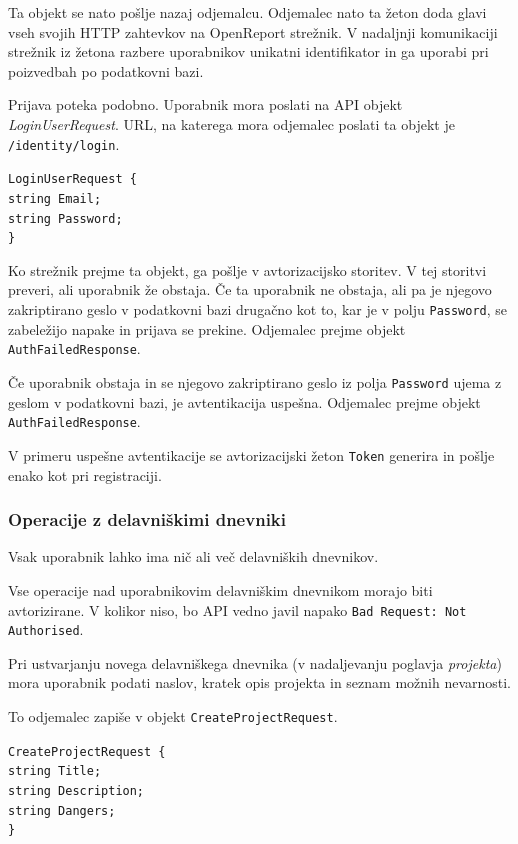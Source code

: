 \documentclass[a4paper, 12pt]{book}
\begin{document}
Ta objekt se nato pošlje nazaj odjemalcu.
Odjemalec nato ta žeton doda glavi vseh svojih HTTP zahtevkov na OpenReport strežnik.
V nadaljnji komunikaciji strežnik iz žetona razbere uporabnikov unikatni identifikator in ga uporabi pri poizvedbah po podatkovni bazi.

Prijava poteka podobno.
Uporabnik mora poslati na API objekt \textit{LoginUserRequest}.
URL, na katerega mora odjemalec poslati ta objekt je \texttt{/identity/login}.

\noindent
\texttt{LoginUserRequest \{ \\
  string Email; \\
  string Password; \\
\} }

Ko strežnik prejme ta objekt, ga pošlje v avtorizacijsko storitev.
V tej storitvi preveri, ali uporabnik že obstaja.
Če ta uporabnik ne obstaja, ali pa je njegovo zakriptirano geslo v podatkovni bazi drugačno kot to, kar je v polju \texttt{Password}, se zabeležijo napake in prijava se prekine.
Odjemalec prejme objekt \texttt{AuthFailedResponse}.

Če uporabnik obstaja in se njegovo zakriptirano geslo iz polja \texttt{Password} ujema z geslom v podatkovni bazi, je avtentikacija uspešna.
Odjemalec prejme objekt \texttt{AuthFailedResponse}.

V primeru uspešne avtentikacije se avtorizacijski žeton \texttt{Token} generira in pošlje enako kot pri registraciji.

\subsubsection{Operacije z delavniškimi dnevniki}

Vsak uporabnik lahko ima nič ali več delavniških dnevnikov.

Vse operacije nad uporabnikovim delavniškim dnevnikom morajo biti avtorizirane.
V kolikor niso, bo API vedno javil napako \texttt{Bad Request: Not Authorised}.

Pri ustvarjanju novega delavniškega dnevnika (v nadaljevanju poglavja \textit{projekta}) mora uporabnik podati naslov, kratek opis projekta in seznam možnih nevarnosti.

To odjemalec zapiše v objekt \texttt{CreateProjectRequest}.

\noindent \texttt{CreateProjectRequest \{ \\
string Title; \\ 
string Description; \\
string Dangers; \\
\} }
\end{document}
